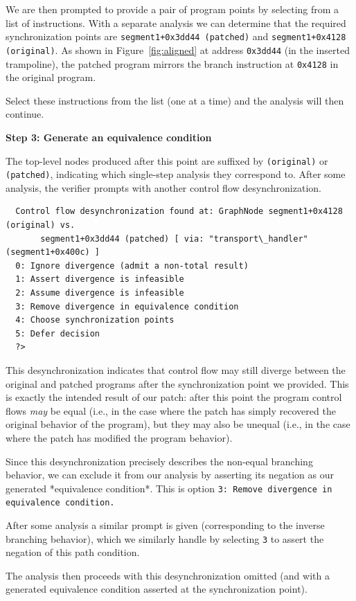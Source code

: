 We are then prompted to provide a pair of program points by selecting from a list of instructions.
With a separate analysis we can determine that the required synchronization points are
\texttt{segment1+0x3dd44 (patched)} and \texttt{segment1+0x4128 (original)}.
As shown in Figure~\ref{fig:aligned}  at address \texttt{0x3dd44} (in the inserted trampoline), 
the patched program mirrors the branch instruction at \texttt{0x4128} in the original program.

Select these instructions from the list (one at a time) and the analysis will then continue.

\noindent\textbf{Step 3: Generate an equivalence condition}

The top-level nodes produced after this point are suffixed by \texttt{(original)} or \texttt{(patched)}, indicating
which single-step analysis they correspond to. After some analysis, the verifier prompts with another
control flow desynchronization.
\begin{verbatim}
  Control flow desynchronization found at: GraphNode segment1+0x4128 (original) vs.
       segment1+0x3dd44 (patched) [ via: "transport\_handler" (segment1+0x400c) ]
  0: Ignore divergence (admit a non-total result) 
  1: Assert divergence is infeasible 
  2: Assume divergence is infeasible 
  3: Remove divergence in equivalence condition 
  4: Choose synchronization points 
  5: Defer decision 
  ?>
\end{verbatim}
This desynchronization indicates that control flow may still diverge between the original and patched
programs after the synchronization point we provided. This is exactly the intended result of our
patch: after this point the program control flows \emph{may} be equal (i.e., in the case where the
patch has simply recovered the original behavior of the program), but they may also be unequal (i.e.,
in the case where the patch has modified the program behavior).

Since this desynchronization precisely describes the non-equal branching behavior, we can exclude it from
our analysis by asserting its negation as our generated *equivalence condition*. This is option 
\texttt{3: Remove divergence in equivalence condition.}

After some analysis a similar prompt is given (corresponding to the inverse branching behavior), which
we similarly handle by selecting \texttt{3} to assert the negation of this path condition.

The analysis then proceeds with this desynchronization omitted (and with a generated equivalence condition asserted
at the synchronization point). 


